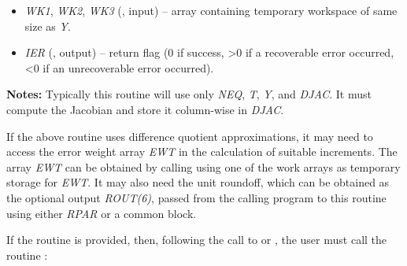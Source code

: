 \documentclass[letterpaper,10pt,english]{sphinxmanual}
\begin{document}
\begin{fulllineitems}
\begin{description}
\begin{itemize}
\item {} 
\emph{WK1}, \emph{WK2}, \emph{WK3}  (, input) -- array containing temporary workspace
of same size as \emph{Y}.

\item {} 
\emph{IER} (, output) -- return flag (0 if success, \textgreater{}0 if a recoverable error
occurred, \textless{}0 if an unrecoverable error occurred).

\end{itemize}

\end{description}

\textbf{Notes:} Typically this routine will use only \emph{NEQ}, \emph{T}, \emph{Y}, and
\emph{DJAC}. It must compute the Jacobian and store it column-wise in \emph{DJAC}.

\end{fulllineitems}


If the above routine uses difference quotient approximations, it may
need to access the error weight array \emph{EWT} in the calculation of
suitable increments. The array \emph{EWT} can be obtained by calling
{\hyperref[f_interface/Optional_output:f/_/FARKGETERRWEIGHTS]{\emph{}}} using one of the work arrays as
temporary storage for \emph{EWT}. It may also need the unit roundoff, which
can be obtained as the optional output \emph{ROUT(6)}, passed from the
calling program to this routine using either \emph{RPAR} or a common block.

If the {\hyperref[f_interface/Usage:f/_/FARKDJAC]{\emph{}}} routine is provided, then, following the
call to {\hyperref[f_interface/Usage:f/_/FARKDENSE]{\emph{}}} or {\hyperref[f_interface/Usage:f/_/FARKLAPACKDENSE]{\emph{}}}, the user
must call the routine {\hyperref[f_interface/Usage:f/_/FARKDENSESETJAC]{\emph{}}}:
\end{document}
